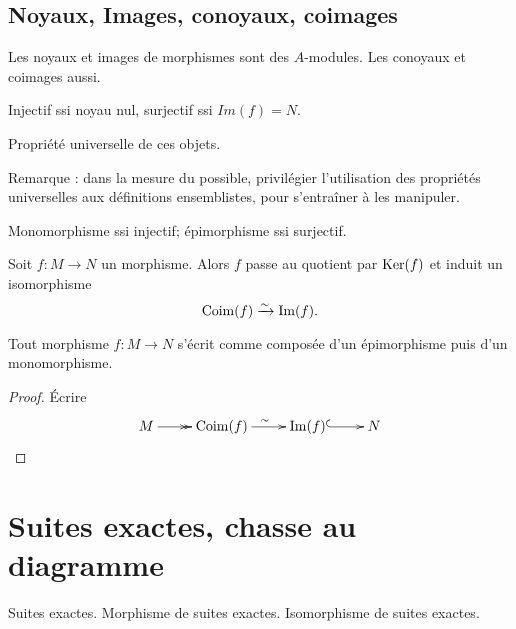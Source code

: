 \subsection{Noyaux, Images, conoyaux, coimages}


\begin{proposition} Les noyaux et images de morphismes sont des $A$-modules. Les conoyaux et coimages aussi.
\end{proposition}

\begin{proposition}
Injectif ssi noyau nul, surjectif ssi $Im(f)=N$.
\end{proposition}

\begin{proposition}Propriété universelle de ces objets.
\end{proposition}

Remarque : dans la mesure du possible, privilégier l'utilisation des propriétés universelles aux définitions ensemblistes, pour s'entraîner à les manipuler.

\begin{theoreme}
Monomorphisme ssi injectif; épimorphisme ssi surjectif.
\end{theoreme}

\begin{theoreme} Soit $f : M\to N$ un morphisme. Alors $f$ passe au quotient par $\operatorname{Ker}(f)$ et induit un isomorphisme 
\[\operatorname{Coim}(f) \xrightarrow{\sim} \operatorname{Im}(f).\]
\end{theoreme}

\begin{theoreme}
Tout morphisme $f:M\to N$ s'écrit  comme composée d'un épimorphisme puis d'un monomorphisme.
\end{theoreme}
\begin{proof}
\'Ecrire 
\[
\xymatrix{
M \ar@{->>}[r] & \Coim(f) \ar[r]^{\sim} & \Im(f) \ar@{^{(}->}[r] & N \\
}
\]
\end{proof}



\section{Suites exactes, chasse au diagramme}

\begin{definition}
Suites exactes. Morphisme de suites exactes. Isomorphisme de suites exactes.
\end{definition}


